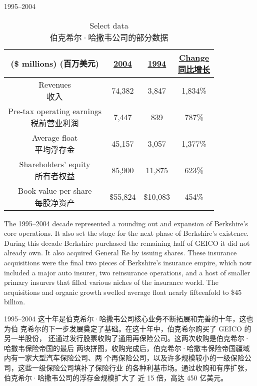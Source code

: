 \begin{section}{1995--2004}

\begin{table}[!htbp]
  \centering
  \begin{center}
    \begin{tabular}{cccc}
      \toprule
      \makecell[c]{(\$ millions) \\ (百万美元)} & \underline{2004} & \underline{1994} & \makecell[c]{\underline{Change} \\ \underline{同比增长}} \\
      \midrule
      \makecell[c]{Revenues \\ 收入} & 74,382 & 3,847 & 1,834\% \\
      \makecell[c]{Pre-tax operating earnings \\ 税前营业利润} & 7,447 & 839 & 787\% \\
      \makecell[c]{Average float \\ 平均浮存金} & 45,157 & 3,057 & 1,377\% \\
      \makecell[c]{Shareholders' equity \\ 所有者权益} & 85,900 & 11,875 & 623\% \\
      \makecell[c]{Book value per share \\ 每股净资产} & \$55,824 & \$10,083 & 454\% \\
      \bottomrule
    \end{tabular}
    \caption{Select data \\ 伯克希尔·哈撒韦公司的部分数据}
  \end{center}
\end{table}

\begin{verseparallel}
  {
    The 1995--2004 decade represented a rounding out and expansion of
    Berkshire's core operations. It also set the stage for the next phase of
    Berkshire's existence. During this decade Berkshire purchased the
    remaining half of GEICO it did not already own. It also acquired General
    Re by issuing shares. These insurance acquisitions were the final two pieces
    of Berkshire's insurance empire, which now included a major auto insurer,
    two reinsurance operations, and a host of smaller primary insurers that
    filled various niches of the insurance world. The acquisitions and organic
    growth swelled average float nearly fifteenfold to \$45 billion. \\
  }
  {

    1995--2004 这十年是伯克希尔·哈撒韦公司核心业务不断拓展和完善的十年，这也为伯
    克希尔的下一步发展奠定了基础。在这十年中，伯克希尔购买了 GEICO 的另一半股份，
    还通过发行股票收购了通用再保险公司。这两次收购是伯克希尔·哈撒韦保险帝国的最后
    两块拼图，收购完成后，伯克希尔·哈撒韦保险帝国疆域内有一家大型汽车保险公司、两
    个再保险公司，以及许多规模较小的一级保险公司，这些一级保险公司填补了保险行业
    的各种利基市场。通过收购和有序扩张，伯克希尔·哈撒韦公司的浮存金规模扩大了
    近 15 倍，高达 450 亿美元。

}
\end{verseparallel}
\end{section}
